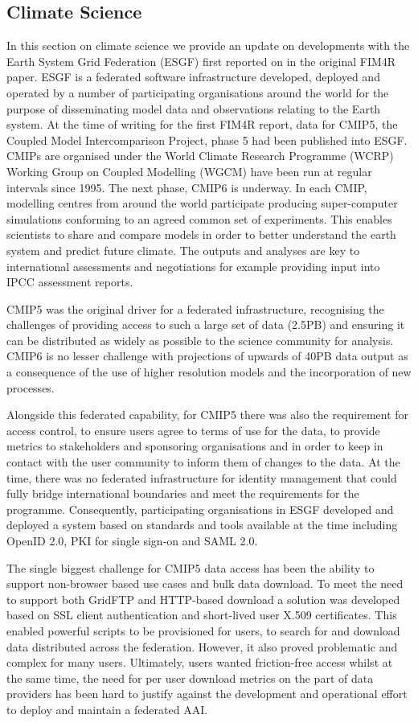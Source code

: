 \documentclass[fleqn,11pt]{wlscirep}
\begin{document}
{\subsection{Climate Science}
In this section on climate science we provide an update on developments with the Earth System Grid Federation (ESGF)\cite{esgf} first reported on in the original FIM4R paper. ESGF is a federated software infrastructure developed, deployed and operated by a number of participating organisations around the world for the purpose of disseminating model data and observations relating to the Earth system. At the time of writing for the first FIM4R report, data for CMIP5, the Coupled Model Intercomparison Project, phase 5 had been published into ESGF. CMIPs are organised under the World Climate Research Programme (WCRP) Working Group on Coupled Modelling (WGCM) have been run at regular intervals since 1995. The next phase, CMIP6 is underway. In each CMIP, modelling centres from around the world participate producing super-computer simulations conforming to an agreed common set of experiments. This enables scientists to share and compare models in order to better understand the earth system and predict future climate. The outputs and analyses are key to international assessments and negotiations for example providing input into IPCC assessment reports.

CMIP5 was the original driver for a federated infrastructure, recognising the challenges of providing access to such a large set of data (2.5PB) and ensuring it can be distributed as widely as possible to the science community for analysis. CMIP6 is no lesser challenge with projections of upwards of 40PB data output as a consequence of the use of higher resolution models and the incorporation of new processes.

Alongside this federated capability, for CMIP5 there was also the requirement for access control, to ensure users agree to terms of use for the data, to provide metrics to stakeholders and sponsoring organisations and in order to keep in contact with the user community to inform them of changes to the data. At the time, there was no federated infrastructure for identity management that could fully bridge international boundaries and meet the requirements for the programme. Consequently, participating organisations in ESGF developed and deployed a system based on standards and tools available at the time including OpenID 2.0, PKI for single sign-on and SAML 2.0.

The single biggest challenge for CMIP5 data access has been the ability to support non-browser based use cases and bulk data download. To meet the need to support both GridFTP and HTTP-based download a solution was developed based on SSL client authentication and short-lived user X.509 certificates. This enabled powerful scripts to be provisioned for users, to search for and download data distributed across the federation. However, it also proved problematic and complex for many users. Ultimately, users wanted friction-free access whilst at the same time, the need for per user download metrics on the part of data providers has been hard to justify against the development and operational effort to deploy and maintain a federated AAI.

}
\end{document}
